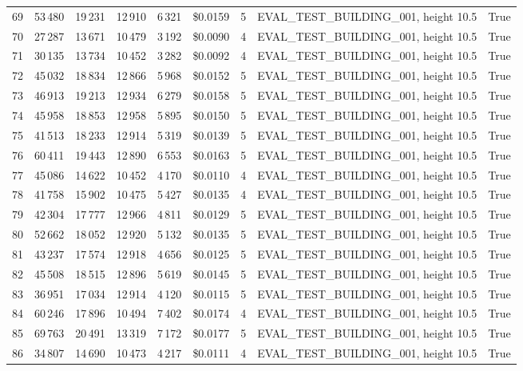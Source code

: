 \documentclass[a4paper,11pt]{article}
\begin{document}
\begin{table}[ht]
\begin{tabular}{r r r r r r r p{3cm} l}
69 & 53\,480 & 19\,231 & 12\,910 & 6\,321 & \$0.0159 & 5 & EVAL\_TEST\_BUILDING\_001, height 10.5 & True \\
70 & 27\,287 & 13\,671 & 10\,479 & 3\,192 & \$0.0090 & 4 & EVAL\_TEST\_BUILDING\_001, height 10.5 & True \\
71 & 30\,135 & 13\,734 & 10\,452 & 3\,282 & \$0.0092 & 4 & EVAL\_TEST\_BUILDING\_001, height 10.5 & True \\
72 & 45\,032 & 18\,834 & 12\,866 & 5\,968 & \$0.0152 & 5 & EVAL\_TEST\_BUILDING\_001, height 10.5 & True \\
73 & 46\,913 & 19\,213 & 12\,934 & 6\,279 & \$0.0158 & 5 & EVAL\_TEST\_BUILDING\_001, height 10.5 & True \\
74 & 45\,958 & 18\,853 & 12\,958 & 5\,895 & \$0.0150 & 5 & EVAL\_TEST\_BUILDING\_001, height 10.5 & True \\
75 & 41\,513 & 18\,233 & 12\,914 & 5\,319 & \$0.0139 & 5 & EVAL\_TEST\_BUILDING\_001, height 10.5 & True \\
76 & 60\,411 & 19\,443 & 12\,890 & 6\,553 & \$0.0163 & 5 & EVAL\_TEST\_BUILDING\_001, height 10.5 & True \\
77 & 45\,086 & 14\,622 & 10\,452 & 4\,170 & \$0.0110 & 4 & EVAL\_TEST\_BUILDING\_001, height 10.5 & True \\
78 & 41\,758 & 15\,902 & 10\,475 & 5\,427 & \$0.0135 & 4 & EVAL\_TEST\_BUILDING\_001, height 10.5 & True \\
79 & 42\,304 & 17\,777 & 12\,966 & 4\,811 & \$0.0129 & 5 & EVAL\_TEST\_BUILDING\_001, height 10.5 & True \\
80 & 52\,662 & 18\,052 & 12\,920 & 5\,132 & \$0.0135 & 5 & EVAL\_TEST\_BUILDING\_001, height 10.5 & True \\
81 & 43\,237 & 17\,574 & 12\,918 & 4\,656 & \$0.0125 & 5 & EVAL\_TEST\_BUILDING\_001, height 10.5 & True \\
82 & 45\,508 & 18\,515 & 12\,896 & 5\,619 & \$0.0145 & 5 & EVAL\_TEST\_BUILDING\_001, height 10.5 & True \\
83 & 36\,951 & 17\,034 & 12\,914 & 4\,120 & \$0.0115 & 5 & EVAL\_TEST\_BUILDING\_001, height 10.5 & True \\
84 & 60\,246 & 17\,896 & 10\,494 & 7\,402 & \$0.0174 & 4 & EVAL\_TEST\_BUILDING\_001, height 10.5 & True \\
85 & 69\,763 & 20\,491 & 13\,319 & 7\,172 & \$0.0177 & 5 & EVAL\_TEST\_BUILDING\_001, height 10.5 & True \\
86 & 34\,807 & 14\,690 & 10\,473 & 4\,217 & \$0.0111 & 4 & EVAL\_TEST\_BUILDING\_001, height 10.5 & True \\

\end{tabular}
\end{table}
\end{document}
